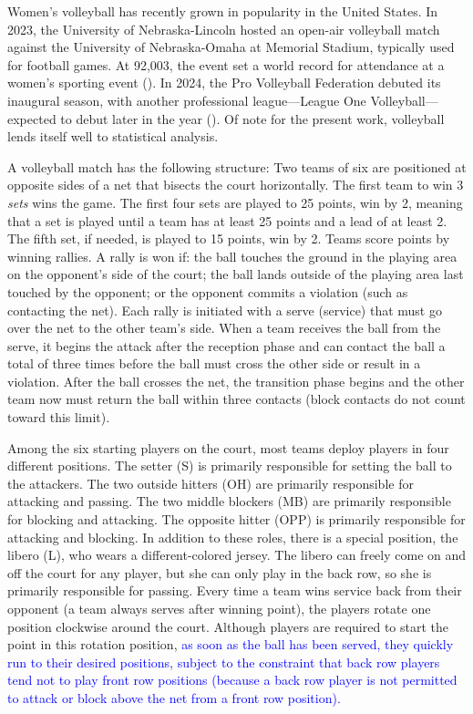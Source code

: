 \documentclass[USenglish]{article}
\theoremstyle{dgthm}
\theoremstyle{dgdef}
\begin{document}
Women's volleyball has recently grown in popularity in the United States. In 2023, the University of Nebraska-Lincoln hosted an open-air volleyball match against the University of Nebraska-Omaha at Memorial Stadium, typically used for football games. At 92,003, the event set a world record for attendance at a women's sporting event (\cite{olson_2023}). In 2024, the Pro Volleyball Federation debuted its inaugural season, with another professional league---League One Volleyball---expected to debut later in the year (\cite{echlin_2024}). Of note for the present work, volleyball lends itself well to statistical analysis.

A volleyball match has the following structure: Two teams of six are positioned at opposite sides of a net that bisects the court horizontally. The first team to win 3 {\it sets} wins the game. The first four sets are played to 25 points, win by 2, meaning that a set is played until a team has at least 25 points and a lead of at least 2. The fifth set, if needed, is played to 15 points, win by 2. Teams score points by winning rallies. A rally is won if: the ball touches the ground in the playing area on the opponent's side of the court; the ball lands outside of the playing area last touched by the opponent; or the opponent commits a violation (such as contacting the net). Each rally is initiated with a serve (service) that must go over the net to the other team's side. When a team receives the ball from the serve, it begins the attack  after  the  reception phase and can contact the ball a total of three times before the ball must cross the other side or result in a violation. After the ball crosses the net, the transition phase begins and the other team now must return the ball within three contacts (block contacts do not count toward this limit).

Among the six starting players on the court, most teams deploy players in four different positions. The setter (S) is primarily responsible for setting the ball to the attackers. The two outside hitters (OH) are primarily responsible for attacking and passing. The two middle blockers (MB) are primarily responsible for blocking and attacking. The opposite hitter (OPP) is primarily responsible for attacking and blocking. In addition to these roles, there is a special position, the libero (L), who wears a different-colored jersey. The libero can freely come on and off the court for any player, but she can only play in the back row, so she is primarily responsible for passing. Every time a team wins service back from their opponent (a team always serves after winning point), the players rotate one position clockwise around the court. Although players are required to start the point in this rotation position, \textcolor{blue}{as soon as the ball has been served, they quickly run to their desired positions, subject to the constraint that back row players tend not to play front row positions (because a back row player is not permitted to attack or block above the net from a front row position).}
\end{document}
